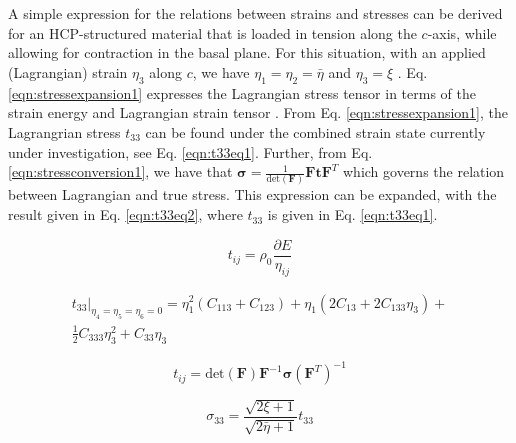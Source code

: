 \documentclass[showpacs,aps,floatfix,prb,reprint,superscriptaddress]{revtex4-1}
\begin{document}
\section{}
A simple expression for the relations between strains and stresses can be derived for an HCP-structured material that is loaded in tension along the $c$-axis, while allowing for contraction in the basal plane. For this situation, with an applied (Lagrangian) strain $\eta_{3}$ along $c$, we have $\eta_{1}=\eta_{2}=\bar{\eta}$ and $\eta_{3}=\xi$ . Eq. \ref{eqn:stressexpansion1} expresses the Lagrangian stress tensor in terms of the strain energy and Lagrangian strain tensor \cite{lopuszynski2007ab}. From Eq. \ref{eqn:stressexpansion1}, the Lagrangrian stress $t_{33}$ can be found under the combined strain state currently under investigation, see Eq. \ref{eqn:t33eq1}. Further, from Eq. \ref{eqn:stressconversion1}, we have that $\bm{\sigma} = \frac{1}{\text{det} \left(\bm{F}\right)} \bm{F} \bm{t} \bm{F}^{T}$ which governs the relation between Lagrangian and true stress. This expression can be expanded, with the result given in Eq. \ref{eqn:t33eq2}, where $t_{33}$ is given in Eq. \ref{eqn:t33eq1}. 



\begin{equation}
\label{eqn:stressexpansion1} 
t_{ij} = \rho_{0} \frac{\partial E}{\eta_{ij}}
\end{equation}

\begin{multline}
\label{eqn:t33eq1} 
t_{33} \Bigr|_{\eta_4=\eta_5=\eta_6=0}  = \eta_{1}^{2} \left(C_{113} + C_{123} \right) + \eta_{1} \left(2C_{13} + 2C_{133}\eta_{3} \right) + \\ \frac{1}{2} C_{333} \eta_{3}^{2} + C_{33} \eta_{3}
\end{multline}

\begin{equation}
\label{eqn:stressconversion1} 
t_{ij} = \text{det} \left(\bm{F}\right) \bm{F}^{-1} \bm{\sigma} \left(\bm{F}^{T}\right)^{-1}
\end{equation}

\begin{equation}
\label{eqn:t33eq2} 
\sigma_{33}  = \frac{\sqrt{2 \xi + 1}}{\sqrt{2 \bar{\eta} + 1}}t_{33}
\end{equation}



\end{document}
